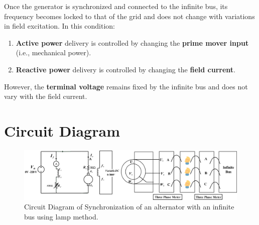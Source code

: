 \documentclass[a4paper,12pt]{article}
\begin{document}
Once the generator is synchronized and connected to the infinite bus, its frequency becomes locked to that of the grid and does not change with variations in field excitation. In this condition:

\begin{enumerate}
	\item \textbf{Active power} delivery is controlled by changing the \textbf{prime mover input} (i.e., mechanical power).
	\item \textbf{Reactive power} delivery is controlled by changing the \textbf{field current}.
\end{enumerate}

However, the \textbf{terminal voltage} remains fixed by the infinite bus and does not vary with the field current.

	\section{Circuit Diagram}
	\begin{figure}[H]
		\centering
			\centering
			\includegraphics[width=1\textwidth]{Images/exp05}
			\caption{Circuit Diagram of Synchronization of an alternator with an infinite bus using lamp method.}
			
	
		
		
		
	\end{figure}
	\newpage
\end{document}
